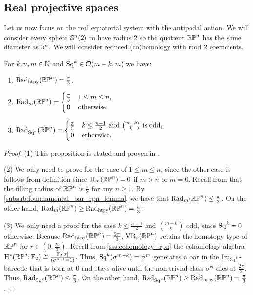
\subsection{Real projective spaces}
\label{s:first_critical_value_rpn}

Let us now focus on the real equatorial system with the antipodal action.
We will consider every sphere \(\mathbb{S}^n(2)\) to have radius 2 so the quotient \(\mathbb{RP}^n\) has the same diameter as \(\mathbb{S}^n\).
We will consider reduced (co)homology with mod 2 coefficients.

\medskip\proposition
For \(k,n,m \in \mathbb{N}\) and \(\mathrm{Sq}^k \in \mathcal{O}(m-k, m)\) we have:
\begin{enumerate}
	\item \(\mathrm{Rad}_{\mathrm{htpy}}(\mathbb{RP}^n) = \frac{\pi}{3}\).
	\item \(\firstdeath{m}{\rp^n} =
	\begin{cases}
		\frac{\pi}{3} & 1 \leq m \leq n, \\
		\hfil 0 & \text{otherwise}.
	\end{cases}\)
	\item \(\firstdeath{\Sq^k}{\rp^n} =
	\begin{cases}
		\tfrac{\pi}{3} & k \leq \frac{n-1}{2} \text{ and } \binom{m-k}{k} \text{ is odd},\\
		\hfil 0 & \text{otherwise}. \\
	\end{cases}\)
\end{enumerate}

\begin{proof}
	(1) This proposition is stated and proven in \cite[Thm.~4.5]{adams2022metric}.

	(2) We only need to prove for the case of $1\leq m\leq n$, since the other case is follows from definition since \(\mathrm{H}_m(\mathbb{RP}^n) = 0\) if \(m > n\) or \(m = 0\).
	Recall from \cite{katz1983filling} that the filling radius of $\mathbb{RP}^n$ is $\frac{\pi}{3}$ for any $n \geq 1$.
	By \cref{subsub:foundamental_bar_rpn_lemma}, we have that $\mathrm{Rad}_{m}(\mathbb{RP}^n)\leq \tfrac{\pi}{3}$.
	On the other hand, $\mathrm{Rad}_{m}(\mathbb{RP}^n)\geq \mathrm{Rad}_{\mathrm{htpy}}(\mathbb{RP}^n) = \tfrac{\pi}{3}$.

	(3) We only need a proof for the case $k \leq \frac{n-1}{2}$ and $\binom{m-k}{k}$ odd, since \(\mathrm{Sq}^k = 0\) otherwise.
	Because $\mathrm{Rad}_{\mathrm{htpy}}(\mathbb{RP}^n)=\frac{2\pi}{3}$, $\mathrm{VR}_r(\mathbb{RP}^n)$ retains the homotopy type of $\mathbb{RP}^n$ for $r \in (0,\tfrac{2\pi}{3})$.
    Recall from \cref{sss:cohomology_rpn} the cohomology algebra \(\mathrm{H}^\ast(\mathbb{RP}^n; {\mathbb{F}_2}) \cong \frac{{\mathbb{F}_2}[\sigma]}{(\sigma^{n+1} = 1)}.\)
    Thus, $\mathrm{Sq}^k(\sigma^{m-k}) = \sigma^{m}$ generates a bar in the $\operatorname{Im}_{\mathrm{Sq}^k}$-barcode that is born at $0$ and stays alive until the non-trivial class $\sigma^{m}$ dies at $\tfrac{2\pi}{3}$.
	Thus, $\mathrm{Rad}_{\mathrm{Sq}^k}(\mathbb{RP}^n) \leq \tfrac{\pi}{3}$.
	On the other hand, $\mathrm{Rad}_{\mathrm{Sq}^k}(\mathbb{RP}^n) \geq \mathrm{Rad}_{\mathrm{htpy}}(\mathbb{RP}^n) = \tfrac{\pi}{3}$.
\end{proof}

